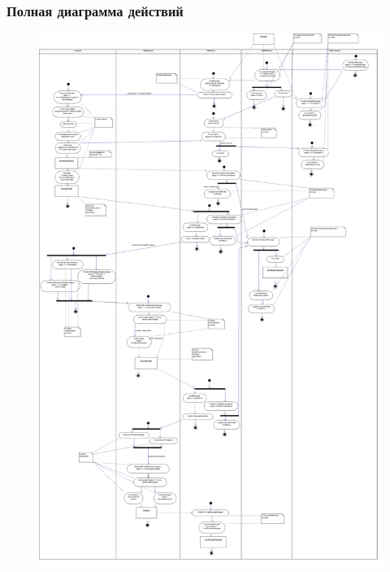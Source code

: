 \documentclass[14pt]{beamer}
\begin{document}
\begin{frame}
\frametitle{Полная диаграмма действий}

\begin{figure} [h] 
  \centering
  \begin{minipage}{50pt}
  	\includegraphics [scale=0.05] {LifecycleActivity}
  \end{minipage}
  \hfill
  \begin{minipage}{150pt}

\end{minipage}
\end{figure}
\end{frame}
\end{document}
